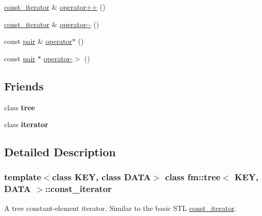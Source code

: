 \begin{DoxyCompactItemize}
\item 
\hyperlink{classfm_1_1tree_1_1const__iterator}{const\_\-iterator} \& \hyperlink{classfm_1_1tree_1_1const__iterator_ac94381e2cc1caccab3790483db4938be}{operator++} ()
\item 
\hyperlink{classfm_1_1tree_1_1const__iterator}{const\_\-iterator} \& \hyperlink{classfm_1_1tree_1_1const__iterator_a2eb6f5cf6ccc023fc757f413b4574799}{operator-\/-\/} ()
\item 
const \hyperlink{classfm_1_1pair}{pair} \& \hyperlink{classfm_1_1tree_1_1const__iterator_a8c1939090f9df91df5e6894439e0a9d7}{operator$\ast$} ()
\item 
const \hyperlink{classfm_1_1pair}{pair} $\ast$ \hyperlink{classfm_1_1tree_1_1const__iterator_a2f996de4cf03771fb8669994a72411bd}{operator-\/$>$} ()
\end{DoxyCompactItemize}
\subsection*{Friends}
\begin{DoxyCompactItemize}
\item 
\hypertarget{classfm_1_1tree_1_1const__iterator_a274b977404a53ceb91af64dfd96c9641}{
class {\bfseries tree}}
\label{classfm_1_1tree_1_1const__iterator_a274b977404a53ceb91af64dfd96c9641}

\item 
\hypertarget{classfm_1_1tree_1_1const__iterator_a67171474c4da6cc8efe0c7fafefd2b2d}{
class {\bfseries iterator}}
\label{classfm_1_1tree_1_1const__iterator_a67171474c4da6cc8efe0c7fafefd2b2d}

\end{DoxyCompactItemize}


\subsection{Detailed Description}
\subsubsection*{template$<$class KEY, class DATA$>$ class fm::tree$<$ KEY, DATA $>$::const\_\-iterator}

A tree constant-\/element iterator. Similar to the basic STL \hyperlink{classfm_1_1tree_1_1const__iterator}{const\_\-iterator}. 

